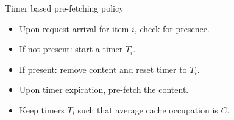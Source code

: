 \documentclass[aspectratio=169]{beamer}
\begin{document}
\begin{frame}{Timer based pre-fetching policy}


\begin{itemize}
	\item<1-> Upon request arrival for item $i$, check for presence.
	\item<2-> If not-present:  start a \alert{timer} $T_i$.
	\item<3-> If present: remove content and reset timer to $T_i$.
	\item<4-> Upon timer expiration, \alert{pre-fetch} the content.
	\item<5-> Keep timers $T_i$ such that \alert{average} cache occupation is $C$.
\end{itemize}

\vspace{3em}

\centering



\end{frame}
\end{document}
